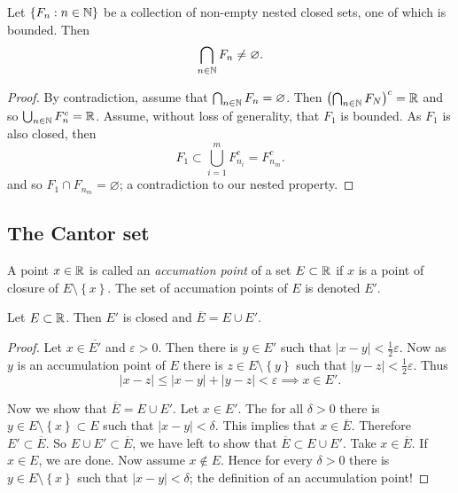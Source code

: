 
\begin{proposition}[]
	Let
	$ \left\{ F_n : n \in \mathbb{N} \right\} $
	be a collection of non-empty nested closed sets, one of which is bounded.
	Then
	\[
		\bigcap_{n \in \mathbb{N}} F_n \neq \varnothing.
	\]
\end{proposition}

\begin{proof}
	By contradiction, assume that 
	$\bigcap_{n \in \mathbb{N}} F_n = \varnothing$.
	Then $\left( \bigcap_{n \in \mathbb{N}} F_N \right)^c = \mathbb{R}$
	and so $\bigcup_{n \in \mathbb{N}} F_n^c = \mathbb{R}$.
	Assume, without loss of generality, that $F_1$ is bounded.
	As $F_1$ is also closed, then
	\[
		F_1 \subset \bigcup_{i=1}^m F_{n_i}^c = F_{n_m}^c.
	\]
	and so $F_1 \cap F_{n_m} = \varnothing$;
	a contradiction to our nested property.
\end{proof}

\subsection{The Cantor set}

\begin{definition}
	A point $x \in \mathbb{R}$ is called an \emph{accumation point} 
	of a set $E \subset \mathbb{R}$ if $x$ is a point of closure
	of $E \setminus \left\{ x \right\}$.
	The set of accumation points of $E$ is denoted $E'$.
\end{definition}

\begin{proposition}[]
	Let $E \subset \mathbb{R}$.
	Then $E'$ is closed and $\overline E = E \cup E'$.
\end{proposition}

\begin{proof}
	Let $x \in \overline{E'}$ and $\varepsilon > 0$.
	Then there is $y \in E'$ such that
	$\left\lvert x - y \right\rvert < \frac12\varepsilon$.
	Now as $y$ is an accumulation point of $E$ there is
	$z \in E \setminus \left\{ y \right\}$ such that
	$\left\lvert y - z \right\rvert < \frac{1}{2} \varepsilon$.
	Thus
	\[
		\left\lvert x - z \right\rvert
		\leq \left\lvert x - y \right\rvert
		+ \left\lvert y - z \right\rvert
		< \varepsilon
		\implies x \in E'.
	\]

	Now we show that $\overline E = E \cup E'$.
	Let $x \in E'$.
	The for all $\delta > 0$ there is 
	$y \in E \setminus \left\{ x \right\} \subset E$
	such that
	$\left\lvert x - y \right\rvert < \delta$.
	This implies that $x \in \overline E$.
	Therefore $E' \subset \overline E$.
	So $E \cup E' \subset \overline E$,
	we have left to show that $\overline E \subset E \cup E'$.
	Take $x \in \overline E$.
	If $x \in E$, we are done.
	Now assume $x \not\in E$.
	Hence for every $\delta > 0$ there is 
	$y \in E \setminus \left\{ x \right\}$ such that
	$\left\lvert x - y \right\rvert < \delta$;
	the definition of an accumulation point!
\end{proof}

